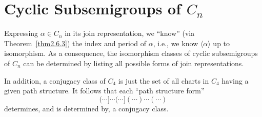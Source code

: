 \documentclass{surv-l}
\numberwithin{equation}{section}
\numberwithin{table}{section}
\numberwithin{figure}{section}
\theoremstyle{plain}
\theoremstyle{definition}
\begin{document}
\section{Cyclic Subsemigroups of $C_{n}$}\label{sec2.7}

Expressing $\alpha\in C_{n}$ in its join representation, we
``know'' (via Theorem~\ref{thm2.6.3}) the index and period of
$\alpha$, i.e., we know $\langle\alpha\rangle$ up to isomorphism.
As a consequence, the isomorphism classes of cyclic subsemigroups
of $C_{n}$ can be determined by listing all possible forms of join
representations.

In addition, a conjugacy class of $C_{4}$ is just the set of all
charts in $C_{4}$ having a given path structure. It follows that
each ``path structure form''
\[
(\cdots]\cdots(\cdots](\cdots)\cdots(\cdots)
\]
determines, and is determined by, a conjugacy class.
\end{document}
